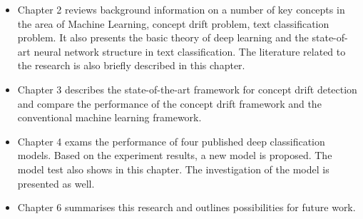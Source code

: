\begin{itemize}
	\item Chapter 2 reviews background information on a number of key concepts in the area of Machine Learning, concept drift problem, text classification problem. It also presents the basic theory of deep learning and the state-of-art neural network structure in text classification. The literature related to the research is also briefly described in this chapter.

	\item Chapter 3 describes the state-of-the-art framework for concept drift detection and compare the performance of the concept drift framework and the conventional machine learning framework. 

	\item Chapter 4 exams the performance of four published deep classification models. Based on the experiment results, a new model is proposed. The model test also shows in this chapter. The investigation of the model is presented as well.

	\item Chapter 6 summarises this research and outlines possibilities for future work.


\end{itemize}

